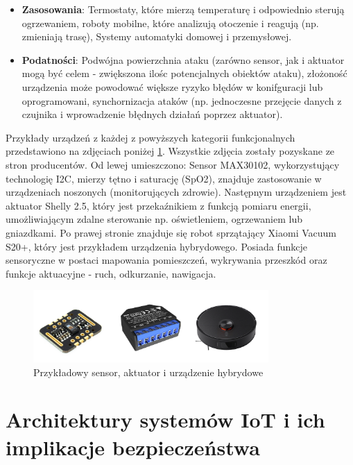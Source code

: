 \begin{enumerate}
        \begin{itemize}
            \item \textbf{Zasosowania}: Termostaty, które mierzą temperaturę i odpowiednio sterują ogrzewaniem, roboty mobilne, które analizują otoczenie i reagują (np. zmieniają trasę), Systemy automatyki domowej i przemysłowej.
            \item \textbf{Podatności}: Podwójna powierzchnia ataku (zarówno sensor, jak i aktuator mogą być celem - zwiększona ilośc potencjalnych obiektów ataku), złożoność urządzenia może powodować większe ryzyko błędów w konifguracji lub oprogramowani, synchornizacja ataków (np. jednoczesne przejęcie danych z czujnika i wprowadzenie błędnych działań poprzez aktuator).
        \end{itemize}
    \end{enumerate}
Przykłady urządzeń z każdej z powyższych kategorii funkcjonalnych przedstawiono na zdjęciach poniżej \ref{fig:Przykładowy sensor, aktuator i urządzenie hybrydowe}. Wszystkie zdjęcia zostały pozyskane ze stron producentów. Od lewej umieszczono: Sensor MAX30102, wykorzystujący technologię I2C, mierzy tętno i saturację (SpO2), znajduje zastosowanie w urządzeniach noszonych (monitorujących zdrowie). Następnym urządzeniem jest aktuator Shelly 2.5, który jest przekaźnikiem z funkcją pomiaru energii, umożliwiającym zdalne sterowanie np. oświetleniem, ogrzewaniem lub gniazdkami. Po prawej stronie znajduje się robot sprzątający Xiaomi Vacuum S20+, który jest przykładem urządzenia hybrydowego. Posiada funkcje sensoryczne w postaci mapowania pomieszczeń, wykrywania przeszkód oraz funkcje aktuacyjne - ruch, odkurzanie, nawigacja.
\begin{figure}[h]
    \centering
    \includegraphics[width=0.8\textwidth]{pictures/urzadzenia-iot.png}
    \caption{Przykładowy sensor, aktuator i urządzenie hybrydowe}
    \label{fig:Przykładowy sensor, aktuator i urządzenie hybrydowe}
\end{figure}

\section{Architektury systemów IoT i ich implikacje bezpieczeństwa}

